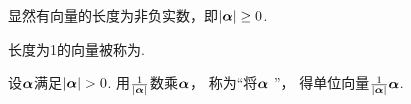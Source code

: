 \begin{property}
显然有向量的长度为非负实数，即\(\abs{\boldsymbol\alpha}\geq0\).
\end{property}

\begin{definition}
长度为1的向量被称为.
\end{definition}

\begin{definition}
\def\f{\frac{1}{\VectorLengthA{\vb\alpha}}}
设\(\boldsymbol\alpha\)满足\(\abs{\boldsymbol\alpha}>0\).
用\(\f\)数乘\(\boldsymbol\alpha\)，
称为“将\(\boldsymbol\alpha\) ”，
得单位向量\(\f\vb\alpha\).
\end{definition}
